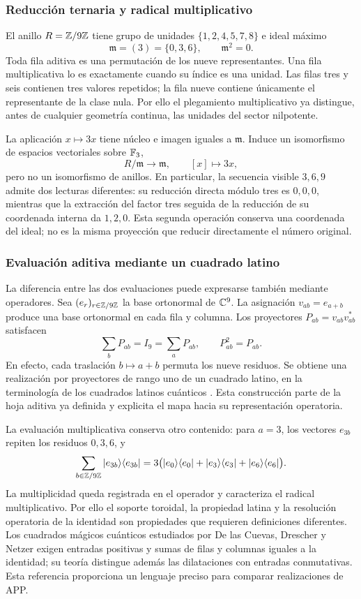 \subsubsection{Reducción ternaria y radical multiplicativo}

El anillo \(R=\mathbb Z/9\mathbb Z\) tiene grupo de unidades \(\{1,2,4,5,7,8\}\) e ideal máximo
\[
 \mathfrak m=(3)=\{0,3,6\},\qquad\mathfrak m^2=0.
\]
Toda fila aditiva es una permutación de los nueve representantes. Una fila multiplicativa lo es exactamente cuando su índice es una unidad. Las filas tres y seis contienen tres valores repetidos; la fila nueve contiene únicamente el representante de la clase nula. Por ello el plegamiento multiplicativo ya distingue, antes de cualquier geometría continua, las unidades del sector nilpotente.

La aplicación \(x\mapsto3x\) tiene núcleo e imagen iguales a \(\mathfrak m\). Induce un isomorfismo de espacios vectoriales sobre \(\mathbb F_3\),
\[
 R/\mathfrak m\longrightarrow\mathfrak m,\qquad [x]\longmapsto3x,
\]
pero no un isomorfismo de anillos. En particular, la secuencia visible \(3,6,9\) admite dos lecturas diferentes: su reducción directa módulo tres es \(0,0,0\), mientras que la extracción del factor tres seguida de la reducción de su coordenada interna da \(1,2,0\). Esta segunda operación conserva una coordenada del ideal; no es la misma proyección que reducir directamente el número original.

\subsubsection{Evaluación aditiva mediante un cuadrado latino}

La diferencia entre las dos evaluaciones puede expresarse también mediante
operadores. Sea \((e_r)_{r\in\mathbb Z/9\mathbb Z}\) la base ortonormal de \(\mathbb C^9\).
La asignación \(v_{ab}=e_{a+b}\) produce una base ortonormal en cada fila
y columna. Los proyectores \(P_{ab}=v_{ab}v_{ab}^{*}\) satisfacen
\[
 \sum_bP_{ab}=I_9=\sum_aP_{ab},\qquad P_{ab}^2=P_{ab}.
\]
En efecto, cada traslación \(b\mapsto a+b\) permuta los nueve residuos.
Se obtiene una realización por proyectores de rango uno de un cuadrado
latino, en la terminología de los cuadrados latinos cuánticos
\cite{mustovicary,delascuevas2023}. Esta construcción parte de la hoja
aditiva ya definida y explicita el mapa hacia su representación operatoria.

La evaluación multiplicativa conserva otro contenido: para \(a=3\), los
vectores \(e_{3b}\) repiten los residuos \(0,3,6\), y
\[
 \sum_{b\in\mathbb Z/9\mathbb Z}|e_{3b}\rangle\langle e_{3b}|
 =3\bigl(|e_0\rangle\langle e_0|+|e_3\rangle\langle e_3|
                    +|e_6\rangle\langle e_6|\bigr).
\]
La multiplicidad queda registrada en el operador y caracteriza el radical
multiplicativo. Por ello el soporte toroidal, la propiedad latina y la
resolución operatoria de la identidad son propiedades que requieren
definiciones diferentes. Los cuadrados mágicos cuánticos estudiados por
De las Cuevas, Drescher y Netzer exigen entradas positivas y sumas de filas
y columnas iguales a la identidad; su teoría distingue además las
dilataciones con entradas conmutativas\cite{delascuevas2020}. Esta referencia
proporciona un lenguaje preciso para comparar realizaciones de APP.

